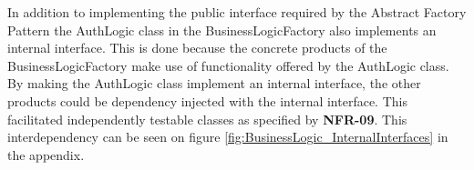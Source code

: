 \documentclass[../report.tex]{subfiles}
\begin{document}
In addition to implementing the public interface required by the Abstract Factory Pattern the AuthLogic class in the BusinessLogicFactory also implements an internal interface.
This is done because the concrete products of the BusinessLogicFactory make use of functionality offered by the AuthLogic class.
By making the AuthLogic class implement an internal interface, the other products could be dependency injected with the internal interface. 
This facilitated independently testable classes as specified by \textbf{NFR-09}.
This interdependency can be seen on figure \ref{fig:BusinessLogic_InternalInterfaces} in the appendix.

\end{document}
